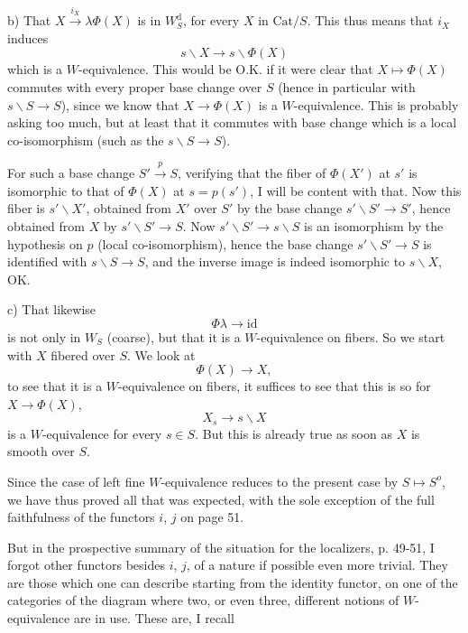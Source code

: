 \documentclass[11pt]{article}
\newcommand{\printedpage}[1]{\marginpar{\footnotesize p.~#1}}
\newcommand{\msp}[1]{\marginpar{\footnotesize [#1]}}
\begin{document}
b) That $X \xrightarrow{i_X} \lambda\Phi(X)$ is in $W_S^{\mathrm{d}}$, for every $X$ in $\mathrm{Cat}/S$. This thus means that $i_X$ induces
\[s\backslash X \longrightarrow s\backslash\Phi(X)\]
which is a $W$-equivalence. This would be O.K. if it were clear that $X \longmapsto \Phi(X)$ commutes with every proper base change over $S$ (hence in particular with $s\backslash S \longrightarrow S$), since we know that $X \longrightarrow \Phi(X)$ is a $W$-equivalence. This is probably asking too much, but at least that it commutes with base change which is a local co-isomorphism (such as the $s\backslash S \longrightarrow S$).

For such a base change $S' \xrightarrow{p} S$, verifying that the fiber of $\Phi(X')$ at $s'$ is isomorphic to that of $\Phi(X)$ at $s = p(s')$, I will be content with that. Now this fiber is $s'\backslash X'$, obtained from $X'$ over $S'$ by the base change $s'\backslash S' \longrightarrow S'$, hence obtained from $X$ by $s'\backslash S' \longrightarrow S$. Now $s'\backslash S' \longrightarrow s\backslash S$ is an isomorphism by the hypothesis
\printedpage{37}
\msp{page 60}
on $p$ (local co-isomorphism), hence the base change $s'\backslash S' \longrightarrow S$ is identified with $s\backslash S \longrightarrow S$, and the inverse image is indeed isomorphic to $s\backslash X$, OK.

c) That likewise
\[\Phi\lambda \longrightarrow \mathrm{id}\]
is not only in $W_S$ (coarse), but that it is a $W$-equivalence on fibers. So we start with $X$ fibered over $S$. We look at
\[\Phi(X) \longrightarrow X,\]
to see that it is a $W$-equivalence on fibers, it suffices to see that this is so for $X \longrightarrow \Phi(X)$,
\[X_s \longrightarrow s\backslash X\]
is a $W$-equivalence for every $s \in S$. But this is already true as soon as $X$ is smooth over $S$.

Since the case of left fine $W$-equivalence reduces to the present case by $S \longmapsto S^{o}$, we have thus proved all that was expected, with the sole exception of the full faithfulness of the functors $i$, $j$ on page 51. %

But in the prospective summary of the situation for the localizers, p. 49-51, I forgot other functors besides $i$, $j$, of a nature if possible even more trivial. They are
\msp{page 61}
those which one can describe starting from the identity functor, on one of the categories of the diagram where two, or even three, different notions of $W$-equivalence are in use. These are, I recall
\end{document}
